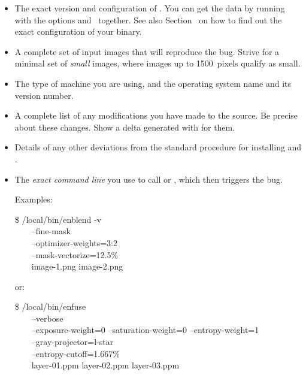 \begin{itemize}
\item
  The exact version and configuration of \App.  You can get the data
  by running \app{} with the options 
  and~ together.  See also
  Section~ on how to find out the
  exact configuration of your binary.

\item
  A complete set of input images that will reproduce the bug.  Strive
  for a minimal set of \emph{small} images, where images up to
  1500~pixels qualify as small.

\item
  The type of machine you are using, and the operating system name and
  its version number.

\item
  A complete list of any modifications you have made to the source.
  Be precise about these changes.  Show a delta generated with
   for them.

\item
  Details of any other deviations from the standard procedure for
  installing  and .

\item
  The \emph{exact command line} you use to call 
  or , which then triggers the bug.

  Examples:

  \begin{terminal}
    \$ \squiggle/local/bin/enblend -v \bslash \\
    ~~~~--fine-mask \bslash \\
    ~~~~--optimizer-weights=3:2 \bslash \\
    ~~~~--mask-vectorize=12.5\% \bslash \\
    ~~~~image-1.png image-2.png
  \end{terminal}

  or:

  \begin{terminal}
    \$ /local/bin/enfuse \bslash \\
    ~~~~--verbose \bslash \\
    ~~~~--exposure-weight=0 --saturation-weight=0 --entropy-weight=1 \bslash \\
    ~~~~--gray-projector=l-star \bslash \\
    ~~~~--entropy-cutoff=1.667\% \bslash \\
    ~~~~layer-01.ppm layer-02.ppm layer-03.ppm
  \end{terminal}


\end{itemize}
